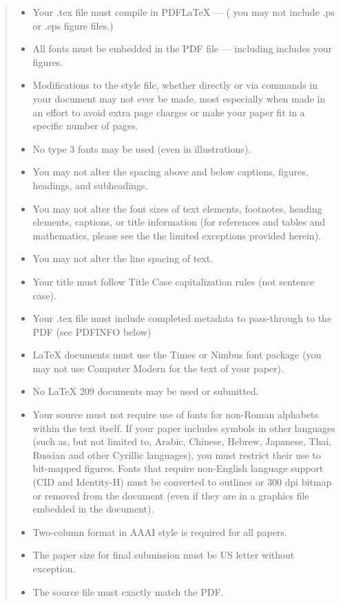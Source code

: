 \documentclass[letterpaper]{article} %
\begin{document}
\begin{quote}
\begin{itemize}
\item Your .tex file must compile in PDF\LaTeX{} --- ( you may not include .ps or .eps figure files.)
\item All fonts must be embedded in the PDF file --- including includes your figures.
\item Modifications to the style file, whether directly or via commands in your document may not ever be made, most especially when made in an effort to avoid extra page charges or make your paper fit in a specific number of pages.
\item No type 3 fonts may be used (even in illustrations).
\item You may not alter the spacing above and below captions, figures, headings, and subheadings.
\item You may not alter the font sizes of text elements, footnotes, heading elements, captions, or title information (for references and tables and mathematics, please see the the limited exceptions provided herein).
\item You may not alter the line spacing of text.
\item Your title must follow Title Case capitalization rules (not sentence case).
\item Your .tex file must include completed metadata to pass-through to the PDF (see PDFINFO below)
\item \LaTeX{} documents must use the Times or Nimbus font package (you may not use Computer Modern for the text of your paper).
\item No \LaTeX{} 209 documents may be used or submitted.
\item Your source must not require use of fonts for non-Roman alphabets within the text itself. If your paper includes symbols in other languages (such as, but not limited to, Arabic, Chinese, Hebrew, Japanese, Thai, Russian and other Cyrillic languages), you must restrict their use to bit-mapped figures. Fonts that require non-English language support (CID and Identity-H) must be converted to outlines or 300 dpi bitmap or removed from the document (even if they are in a graphics file embedded in the document). 
\item Two-column format in AAAI style is required for all papers.
\item The paper size for final submission must be US letter without exception.
\item The source file must exactly match the PDF.

\end{itemize}
\end{quote}
\end{document}
